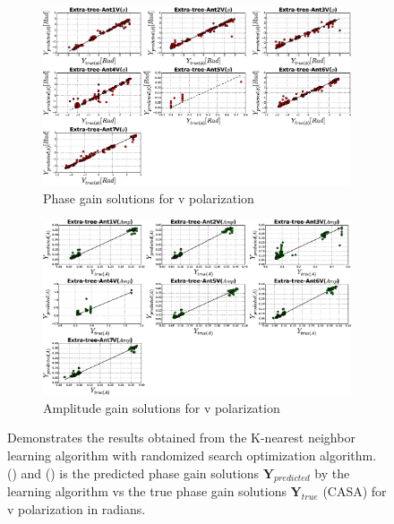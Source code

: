 \begin{figure}[H]
   \centering
    \begin{subfigure}[t]{0.52\textheight}
        
        \includegraphics[width=\textwidth]{images/Extra-treeVphase.eps} 
        \caption{Phase gain solutions for v polarization} \label{A7}
    \end{subfigure}
    
      \begin{subfigure}[t]{0.52\textheight}
       
        \includegraphics[width=\textwidth]{images/Extra-treeVamp.eps} 
        \caption{Amplitude gain solutions for v polarization} \label{B7}
    \end{subfigure}
    \caption{Demonstrates the results obtained from the K-nearest neighbor learning algorithm with randomized search optimization algorithm. () and () is the predicted phase gain solutions $\textbf{Y}_{predicted}$ by the learning algorithm vs the true phase gain solutions $\textbf{Y}_{true}$ (CASA) for v polarization in radians.}
    \end{figure} 
   
